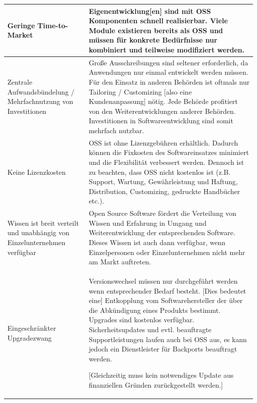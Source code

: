 \documentclass[a4paper]{article}
\newcommand\textstyleACRONYM[1]{#1}
\begin{document}
\begin{flushleft}
\tablehead{}
\begin{supertabular}{|m{1.8900598in}m{4.77126in}|}
\hline
{} Geringe Time-to-Market &
 Eigenentwicklung[en] sind mit
\textstyleACRONYM{OSS} Komponenten schnell realisierbar. Viele Module
existieren bereits als \textstyleACRONYM{OSS} und m\"ussen f\"ur
konkrete Bed\"urfnisse nur kombiniert und teilweise modifiziert
werden.\\\hline
{}
\hypertarget{ZentraleAufwandsbndelung}{}Zentrale Aufwandsb\"undelung /
Mehrfachnutzung von Investitionen &
 Gro{\ss}e Ausschreibungen sind seltener
erforderlich, da Anwendungen nur einmal entwickelt werden m\"ussen.
F\"ur den Einsatz in anderen Beh\"orden ist oftmals nur Tailoring /
Customizing [also eine Kundenanpassung] n\"otig. Jede Beh\"orde
profitiert von den Weiterentwicklungen anderer Beh\"orden.
Investitionen in Softwareentwicklung sind somit mehrfach
nutzbar.\\\hline
{} \hypertarget{KeineLizenzkosten}{}Keine
Lizenzkosten &
 \textstyleACRONYM{OSS} ist ohne
Lizenzgeb\"uhren erh\"altlich. Dadurch k\"onnen die Fixkosten des
Softwareinsatzes minimiert und die Flexibilit\"at verbessert werden.
Dennoch ist zu beachten, dass \textstyleACRONYM{OSS} nicht kostenlos
ist (\textstyleACRONYM{z.B.} Support, Wartung, Gew\"ahrleistung und
Haftung, Distribution, Customizing, gedruckte Handb\"ucher
\textstyleACRONYM{etc.}).\\\hline
{} \hypertarget{Wissenistbreitverteilt}{}Wissen
ist breit verteilt und unabh\"angig von Einzelunternehmen verf\"ugbar &
 Open Source Software f\"ordert die Verteilung
von Wissen und Erfahrung in Umgang und Weiterentwicklung der
entsprechenden Software. Dieses Wissen ist auch dann verf\"ugbar, wenn
Einzelpersonen oder Einzelunternehmen nicht mehr am Markt
auftreten.\\\hline
{}
\hypertarget{EingeschrnkterUpgradezwang}{}Eingeschr\"ankter
Upgradezwang &
{ Versionswechsel m\"ussen nur durchgef\"uhrt
werden wenn entsprechender Bedarf besteht. [Dies bedeutet eine]
Entkopplung vom Softwarehersteller der \"uber die Abk\"undigung eines
Produkts bestimmt. Upgrades sind kostenlos verf\"ugbar.
Sicherheitsupdates und evtl. beauftragte Supportleistungen laufen auch
bei \textstyleACRONYM{OSS} aus, es kann jedoch ein Dienstleister f\"ur
Backports beauftragt werden.}

 [Gleichzeitig muss kein notwendiges Update aus
finanziellen Gr\"unden zur\"uckgestellt werden.]\\\hline
\end{supertabular}
\end{flushleft}
\end{document}
